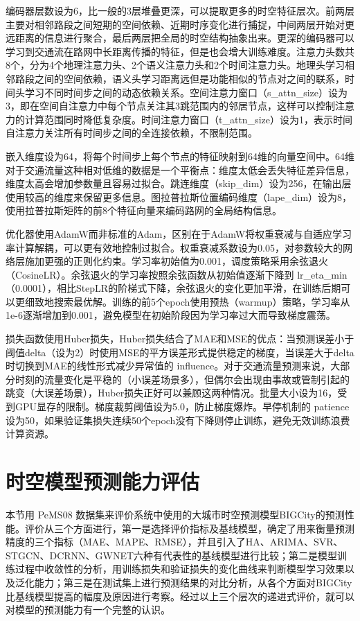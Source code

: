 编码器层数设为6，比一般的3层堆叠更深，可以提取更多的时空特征层次。前两层主要对相邻路段之间短期的空间依赖、近期时序变化进行捕捉，中间两层开始对更远距离的信息进行聚合，最后两层把全局的时空结构抽象出来。更深的编码器可以学习到交通流在路网中长距离传播的特征，但是也会增大训练难度。注意力头数共8个，分为4个地理注意力头、2个语义注意力头和2个时间注意力头。地理头学习相邻路段之间的空间依赖，语义头学习距离远但是功能相似的节点对之间的联系，时间头学习不同时间步之间的动态依赖关系。空间注意力窗口（s\_attn\_size）设为3，即在空间自注意力中每个节点关注其3跳范围内的邻居节点，这样可以控制注意力的计算范围同时降低复杂度。时间注意力窗口（t\_attn\_size）设为1，表示时间自注意力关注所有时间步之间的全连接依赖，不限制范围。

嵌入维度设为64，将每个时间步上每个节点的特征映射到64维的向量空间中。64维对于交通流量这种相对低维的数据是一个平衡点：维度太低会丢失特征差异信息，维度太高会增加参数量且容易过拟合。跳连维度（skip\_dim）设为256，在输出层使用较高的维度来保留更多信息。图拉普拉斯位置编码维度（lape\_dim）设为8，使用拉普拉斯矩阵的前8个特征向量来编码路网的全局结构信息。

优化器使用AdamW而非标准的Adam，区别在于AdamW将权重衰减与自适应学习率计算解耦，可以更有效地控制过拟合。权重衰减系数设为0.05，对参数较大的网络层施加更强的正则化约束。学习率初始值为0.001，调度策略采用余弦退火（CosineLR）。余弦退火的学习率按照余弦函数从初始值逐渐下降到 lr\_eta\_min（0.0001），相比StepLR的阶梯式下降，余弦退火的变化更加平滑，在训练后期可以更细致地搜索最优解。训练的前5个epoch使用预热（warmup）策略，学习率从1e-6逐渐增加到0.001，避免模型在初始阶段因为学习率过大而导致梯度震荡。

损失函数使用Huber损失，Huber损失结合了MAE和MSE的优点：当预测误差小于阈值delta（设为2）时使用MSE的平方误差形式提供稳定的梯度，当误差大于delta时切换到MAE的线性形式减少异常值的 influence。对于交通流量预测来说，大部分时刻的流量变化是平稳的（小误差场景多），但偶尔会出现由事故或管制引起的跳变（大误差场景），Huber损失正好可以兼顾这两种情况。批量大小设为16，受到GPU显存的限制。梯度裁剪阈值设为5.0，防止梯度爆炸。早停机制的 patience 设为50，如果验证集损失连续50个epoch没有下降则停止训练，避免无效训练浪费计算资源。

\section{时空模型预测能力评估}

本节用 PeMS08 数据集来评价系统中使用的大城市时空预测模型BIGCity的预测性能。评价从三个方面进行，第一是选择评价指标及基线模型，确定了用来衡量预测精度的三个指标（MAE、MAPE、RMSE），并且引入了HA、ARIMA、SVR、STGCN、DCRNN、GWNET六种有代表性的基线模型进行比较；第二是模型训练过程中收敛性的分析，用训练损失和验证损失的变化曲线来判断模型学习效果以及泛化能力；第三是在测试集上进行预测结果的对比分析，从各个方面对BIGCity比基线模型提高的幅度及原因进行考察。经过以上三个层次的递进式评价，就可以对模型的预测能力有一个完整的认识。

